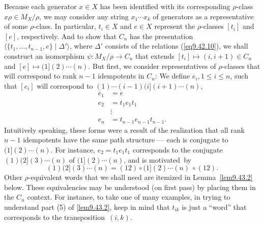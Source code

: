 \documentclass{surv-l}
\numberwithin{equation}{section}
\numberwithin{table}{section}
\numberwithin{figure}{section}
\theoremstyle{plain}
\theoremstyle{definition}
\begin{document}
Because each generator $x\in X$ has been identified with its
corresponding $\rho$-class $ x\rho\in M_{X}/\rho$, we may consider
any string $x_{1}\cdots x_{k}$ of generators as a representative
of some $\rho$-class. In particular, $t_{i}\in X$ and $e\in X$
represent the $\rho$-classes $[t_{i}]$ and $[e]$, respectively.
And to show that $C_{n}$ has the presentation
$\langle\{t_{1},\ldots, t_{n-1}, e\} \mid \Delta'\rangle$,
where $\Delta'$ consists of the relations (\ref{eq9.42.10}), we
shall construct an isomorphism $\psi : M_{X}/\rho\rightarrow
C_{n}$ that extends $[t_{i}]\mapsto(i, i+1)\in C_{n}$ and
$[e]\mapsto(1](2)\cdots(n)$. But first, we consider
representatives of $\rho$-classes that will correspond to rank
$n-1$ idempotents in $C_{n}$: We define $e_{i}, 1\leq i\leq n$,
such that $[e_{i}]$ will correspond to $(1)\cdots
(i-1)(i](i+1)\cdots (n)$,
\begin{equation}\label{eq9.43.1}
\begin{split}
e_{1} &=e \\
e_{2}&=t_{1}e_{1}t_{1} \\
&\vdots \\
e_{n}&=t_{n-1}e_{n-1}t_{n-1}.
\end{split}
\end{equation}
Intuitively speaking, these forms were a result of the realization
that all rank $n-1$ idempotents have the same path structure
--- each is conjugate to $(1](2)\cdots(n)$. For instance,
$e_{2}=t_{1}e_{1}t_{1}$ corresponds to the conjugate $(1)
(2](3)\cdots(n)$ of $(1](2)\cdots(n)$, and is motivated~by
\[
(1)(2](3)\cdots(n)=(12)\circ(1](2)\cdots(n)\ \circ (12).
\]
Other $\rho$-equivalent words that we shall need are itemized in
Lemma~\ref{lem9.43.2} below. These equivalencies may be understood
(on first pass) by placing them in the $C_{n}$ context. For
instance, to take one of many examples, in trying to understand
part (5) of \ref{lem9.43.2}, keep in mind that $t_{ik}$ is just a
``word'' that corresponds to the transposition~$(i, k)$.
\end{document}
